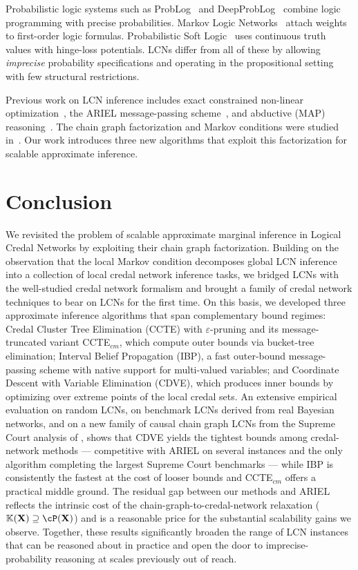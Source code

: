 \documentclass{article}
\newcommand{\kr}[1]{\mathbb{K}\!\left( #1 \right)}
\begin{document}
Probabilistic logic systems such as ProbLog~\cite{problog} and DeepProbLog~\cite{manhaeve2018deepproblog} combine logic programming with precise probabilities. Markov Logic Networks~\cite{mln} attach weights to first-order logic formulas. Probabilistic Soft Logic~\cite{bach2017psl} uses continuous truth values with hinge-loss potentials. LCNs differ from all of these by allowing \emph{imprecise} probability specifications and operating in the propositional setting with few structural restrictions.

Previous work on LCN inference includes exact constrained non-linear optimization~\cite{marinescu2022neurips}, the ARIEL message-passing scheme~\cite{marinescu2023lcn}, and abductive (MAP) reasoning~\cite{marinescu2024neurips}. The chain graph factorization and Markov conditions were studied in~\cite{cozman23a}. Our work introduces three new algorithms that exploit this factorization for scalable approximate inference.

\section{Conclusion}
\label{sec-conclusion}

We revisited the problem of scalable approximate marginal inference in Logical Credal Networks by exploiting their chain graph factorization. Building on the observation that the local Markov condition decomposes global LCN inference into a collection of local credal network inference tasks, we bridged LCNs with the well-studied credal network formalism and brought a family of credal network techniques to bear on LCNs for the first time. On this basis, we developed three approximate inference algorithms that span complementary bound regimes: Credal Cluster Tree Elimination (CCTE) with $\varepsilon$-pruning and its message-truncated variant CCTE$_{cm}$, which compute outer bounds via bucket-tree elimination; Interval Belief Propagation (IBP), a fast outer-bound message-passing scheme with native support for multi-valued variables; and Coordinate Descent with Variable Elimination (CDVE), which produces inner bounds by optimizing over extreme points of the local credal sets. An extensive empirical evaluation on random LCNs, on benchmark LCNs derived from real Bayesian networks, and on a new family of causal chain graph LCNs from the Supreme Court analysis of \cite{ogburn2020causal}, shows that CDVE yields the tightest bounds among credal-network methods --- competitive with ARIEL on several instances and the only algorithm completing the largest Supreme Court benchmarks --- while IBP is consistently the fastest at the cost of looser bounds and CCTE$_{cm}$ offers a practical middle ground. The residual gap between our methods and ARIEL reflects the intrinsic cost of the chain-graph-to-credal-network relaxation ($\kr{\bX} \supseteq \cP(\bX)$) and is a reasonable price for the substantial scalability gains we observe. Together, these results significantly broaden the range of LCN instances that can be reasoned about in practice and open the door to imprecise-probability reasoning at scales previously out of reach.
\end{document}
